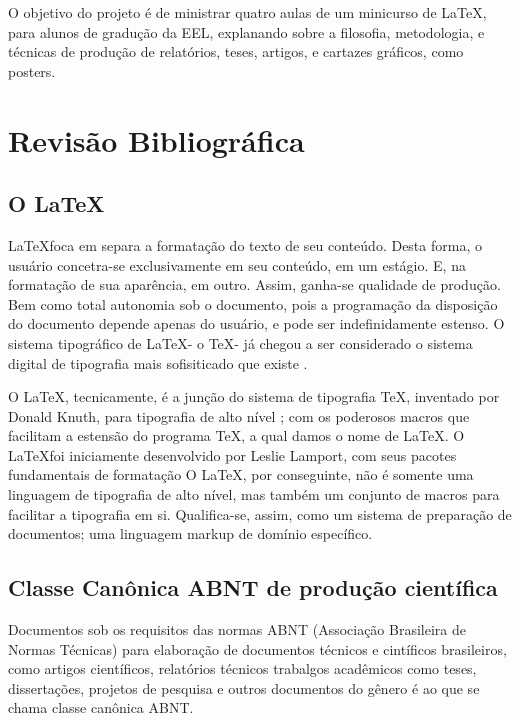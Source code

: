 \documentclass[
	12pt,				%
	openright,			%
	oneside,			%
	a4paper,			%
	english,			%
	french,				%
	spanish,			%
	brazil,				%
	]{abntex2}
\begin{document}
O objetivo do projeto é de ministrar quatro aulas de um minicurso de
\LaTeX, para alunos de gradução da EEL, explanando sobre a filosofia,
metodologia, e técnicas de produção de relatórios, teses, artigos, e
cartazes gráficos, como posters.

\chapter{Revisão Bibliográfica}

\section{O \LaTeX}

\LaTeX foca em separa a formatação do texto de seu conteúdo. Desta
forma, o usuário concetra-se exclusivamente em seu conteúdo, em um
estágio. E, na formatação de sua aparência, em outro. Assim, ganha-se
qualidade de produção. Bem como total autonomia sob o documento, pois
a programação da disposição do documento depende apenas do usuário, e
pode ser indefinidamente estenso. O sistema tipográfico de \LaTeX - o
\TeX - já chegou a ser considerado o sistema digital de
tipografia mais sofisiticado que existe \cite{haralambous2007}.

O \LaTeX, tecnicamente, é a junção do sistema de tipografia \TeX,
inventado por Donald Knuth, para tipografia de alto nível
\cite{knuth1986}; com os poderosos macros que facilitam a estensão do programa \TeX, a qual damos o nome de
\LaTeX. O \LaTeX foi iniciamente desenvolvido por Leslie Lamport, com
seus pacotes fundamentais de formatação \cite{lamport1994} O \LaTeX,
por conseguinte, não é somente uma linguagem de tipografia de alto
nível, mas também um conjunto de macros para facilitar a tipografia em
si. Qualifica-se, assim, como um sistema de preparação de documentos;
uma linguagem markup de domínio específico.

\section{Classe Canônica ABNT de produção científica}

Documentos sob os requisitos das normas ABNT (Associação Brasileira de Normas
Técnicas) para elaboração de documentos técnicos e cintíficos
brasileiros, como artigos científicos, relatórios técnicos trabalgos
acadêmicos como teses, dissertações, projetos de pesquisa e outros
documentos do gênero \cite{abntex2012} é ao que se chama classe
canônica ABNT.
\end{document}
